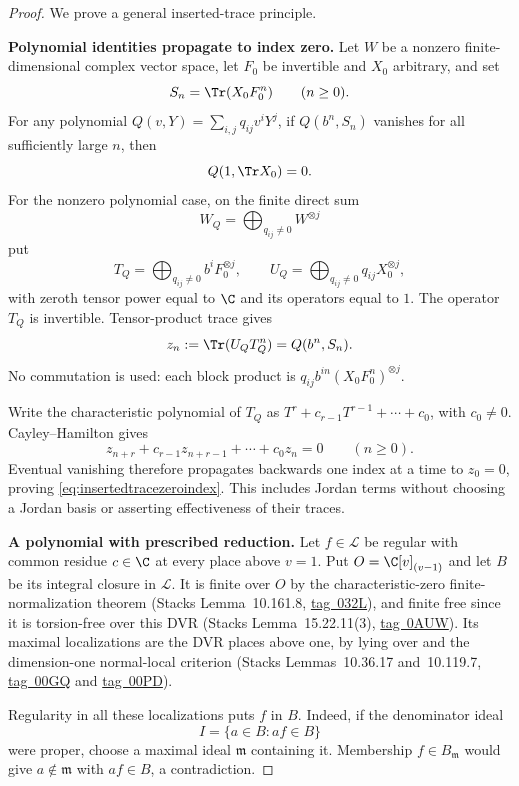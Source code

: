 \documentclass[11pt,a4paper]{article}
\theoremstyle{named}\newtheorem{finding}{Finding}[section]
\theoremstyle{definition}\newtheorem{definition}[finding]{Definition}
\theoremstyle{remark}\newtheorem{remark}[finding]{Remark}
\begin{document}
\begin{proof}
We prove a general inserted-trace principle.

\par\smallskip\noindent\textbf{Polynomial identities propagate to index zero.}\quad
Let $W$ be a nonzero finite-dimensional complex vector
space, let $F_0$ be invertible and $X_0$ arbitrary, and set
\[
 S_n=\Tr(X_0F_0^n)\qquad(n\ge0).
\]
For any polynomial
$Q(v,Y)=\sum_{i,j}q_{ij}v^iY^j$, if $Q(b^n,S_n)$
vanishes for all sufficiently large $n$, then
\begin{equation}\label{eq:insertedtracezeroindex}
 Q(1,\Tr X_0)=0.
\end{equation}
For the nonzero polynomial case, on the finite direct sum
\[
 W_Q=\bigoplus_{q_{ij}\ne0}W^{\otimes j}
\]
put
\[
 T_Q=\bigoplus_{q_{ij}\ne0}b^iF_0^{\otimes j},
 \qquad
 U_Q=\bigoplus_{q_{ij}\ne0}q_{ij}X_0^{\otimes j},
\]
with zeroth tensor power equal to $\C$ and its
operators equal to $1$.
The operator $T_Q$ is invertible.
Tensor-product trace gives
\[
 z_n:=\Tr(U_QT_Q^n)=Q(b^n,S_n).
\]
No commutation is used: each block product is
$q_{ij}b^{in}(X_0F_0^n)^{\otimes j}$.

Write the characteristic polynomial of $T_Q$ as
$T^r+c_{r-1}T^{r-1}+\cdots+c_0$, with $c_0\ne0$.
Cayley--Hamilton gives
\[
 z_{n+r}+c_{r-1}z_{n+r-1}+\cdots+c_0z_n=0
 \qquad(n\ge0).
\]
Eventual vanishing therefore propagates backwards
one index at a time to $z_0=0$, proving
\eqref{eq:insertedtracezeroindex}.
This includes Jordan terms without choosing a
Jordan basis or asserting effectiveness of their traces.

\par\smallskip\noindent\textbf{A polynomial with prescribed reduction.}\quad
Let $f\in\mathcal L$ be regular with common residue
$c\in\C$ at every place above $v=1$.
Put $O=\C[v]_{(v-1)}$ and let $B$ be its integral closure
in $\mathcal L$.
It is finite over $O$ by the characteristic-zero
finite-normalization theorem
(Stacks Lemma~10.161.8,
\href{https://stacks.math.columbia.edu/tag/032L}{tag~032L}),
and finite free since it is torsion-free over this DVR
(Stacks Lemma~15.22.11(3),
\href{https://stacks.math.columbia.edu/tag/0AUW}{tag~0AUW}).
Its maximal localizations are the DVR places above one,
by lying over and the dimension-one normal-local criterion
(Stacks Lemmas~10.36.17 and~10.119.7,
\href{https://stacks.math.columbia.edu/tag/00GQ}{tag~00GQ}
and
\href{https://stacks.math.columbia.edu/tag/00PD}{tag~00PD}).

Regularity in all these localizations puts $f$ in $B$.
Indeed, if the denominator ideal
\[
 I=\{a\in B:af\in B\}
\]
were proper, choose a maximal ideal $\mathfrak m$
containing it. Membership $f\in B_{\mathfrak m}$
would give $a\notin\mathfrak m$ with $af\in B$,
a contradiction.


\end{proof}
\end{document}
